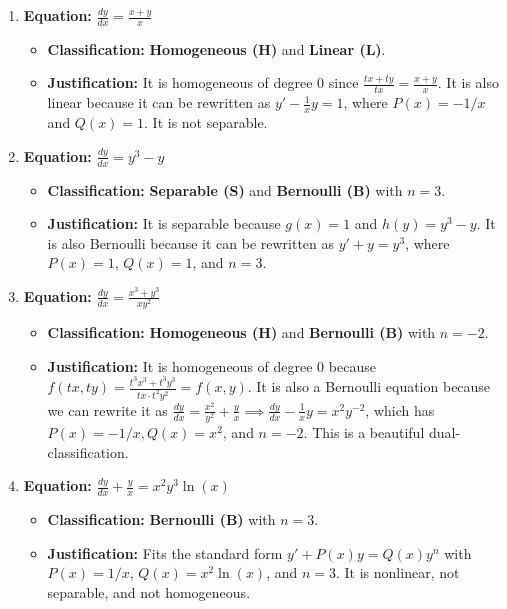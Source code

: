 \documentclass[11pt,letterpaper]{article}
\begin{document}
\begin{enumerate}[label=\textbf{\arabic*.}]
    \item \textbf{Equation:} $\frac{dy}{dx} = \frac{x+y}{x}$
    \begin{itemize}
        \item \textbf{Classification:} \textbf{Homogeneous (H)} and \textbf{Linear (L)}.
        \item \textbf{Justification:} It is homogeneous of degree 0 since $\frac{tx+ty}{tx} = \frac{x+y}{x}$. It is also linear because it can be rewritten as $y' - \frac{1}{x}y = 1$, where $P(x) = -1/x$ and $Q(x) = 1$. It is not separable.
    \end{itemize}

    \item \textbf{Equation:} $\frac{dy}{dx} = y^3 - y$
    \begin{itemize}
        \item \textbf{Classification:} \textbf{Separable (S)} and \textbf{Bernoulli (B)} with $n=3$.
        \item \textbf{Justification:} It is separable because $g(x)=1$ and $h(y)=y^3-y$. It is also Bernoulli because it can be rewritten as $y' + y = y^3$, where $P(x)=1$, $Q(x)=1$, and $n=3$.
    \end{itemize}

    \item \textbf{Equation:} $\frac{dy}{dx} = \frac{x^3 + y^3}{xy^2}$
    \begin{itemize}
        \item \textbf{Classification:} \textbf{Homogeneous (H)} and \textbf{Bernoulli (B)} with $n=-2$.
        \item \textbf{Justification:} It is homogeneous of degree 0 because $f(tx,ty) = \frac{t^3 x^3 + t^3 y^3}{tx \cdot t^2 y^2} = f(x,y)$. It is also a Bernoulli equation because we can rewrite it as $\frac{dy}{dx} = \frac{x^2}{y^2} + \frac{y}{x} \implies \frac{dy}{dx} - \frac{1}{x}y = x^2 y^{-2}$, which has $P(x) = -1/x, Q(x) = x^2$, and $n = -2$. This is a beautiful dual-classification.
    \end{itemize}

    \item \textbf{Equation:} $\frac{dy}{dx} + \frac{y}{x} = x^2 y^3 \ln(x)$
    \begin{itemize}
        \item \textbf{Classification:} \textbf{Bernoulli (B)} with $n=3$.
        \item \textbf{Justification:} Fits the standard form $y' + P(x)y = Q(x)y^n$ with $P(x) = 1/x$, $Q(x) = x^2 \ln(x)$, and $n=3$. It is nonlinear, not separable, and not homogeneous.
    \end{itemize}


\end{enumerate}
\end{document}
